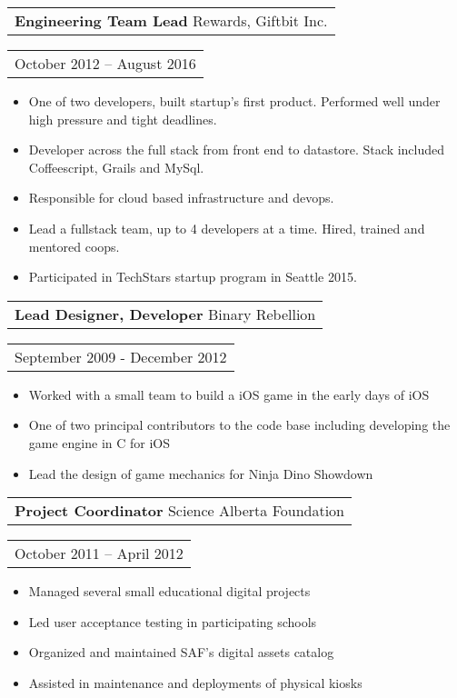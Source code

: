 \documentclass{resume}
\begin{document}
\begin{resume}
    \begin{tabular}[t]{@{}l}
        {\bf Engineering Team Lead} Rewards, Giftbit Inc.
    \end{tabular}\vspace{+0.05in}
    \hfill
    \begin{tabular}[t]{l@{}}
        October 2012 -- August 2016
    \end{tabular}
    \begin{itemize} \itemsep -2pt
    \item One of two developers, built startup’s first product. Performed well under high pressure and tight deadlines.
    \item Developer across the full stack from front end to datastore. Stack included Coffeescript, Grails and MySql.
    \item Responsible for cloud based infrastructure and devops.
    \item Lead a fullstack team, up to 4 developers at a time. Hired, trained and mentored coops.
    \item Participated in TechStars startup program in Seattle 2015.
    \end{itemize}

    \begin{tabular}[t]{@{}l}
        {\bf Lead Designer, Developer} Binary Rebellion
    \end{tabular}\vspace{+0.05in}
    \hfill
    \begin{tabular}[t]{l@{}}
        September 2009 - December 2012
    \end{tabular}
    \begin{itemize} \itemsep -2pt
    \item Worked with a small team to build a iOS game in the early days of iOS
    \item One of two principal contributors to the code base including developing the game engine in C for iOS
    \item Lead the design of game mechanics for Ninja Dino Showdown
    \end{itemize}

    \begin{tabular}[t]{@{}l}
        {\bf Project Coordinator} Science Alberta Foundation
    \end{tabular}\vspace{+0.05in}
    \hfill
    \begin{tabular}[t]{l@{}}
        October 2011 – April 2012
    \end{tabular}
    \begin{itemize} \itemsep -2pt
    \item Managed several small educational digital projects
    \item Led user acceptance testing in participating schools
    \item Organized and maintained SAF’s digital assets catalog
    \item Assisted in maintenance and deployments of physical kiosks
    \end{itemize}


\end{resume}
\end{document}
